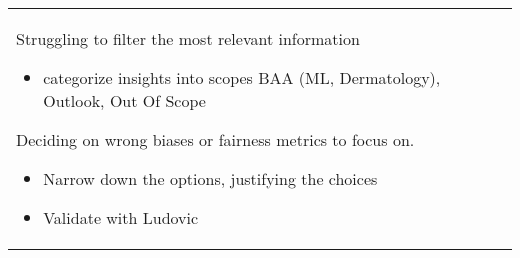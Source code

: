 \documentclass[a4paper,11pt]{article}
\begin{document}
\begin{longtable}{|p{3.5cm}|p{12cm}|}
		Struggling to filter the most relevant information
		\begin{itemize}
			\item categorize insights into scopes BAA (ML, Dermatology), Outlook, Out Of Scope
		\end{itemize}
		
		Deciding on wrong biases or fairness metrics to focus on.
		\begin{itemize}
			\item Narrow down the options, justifying the choices
			\item Validate with Ludovic
		\end{itemize}
		
		 \\
		

\end{longtable}
\end{document}
